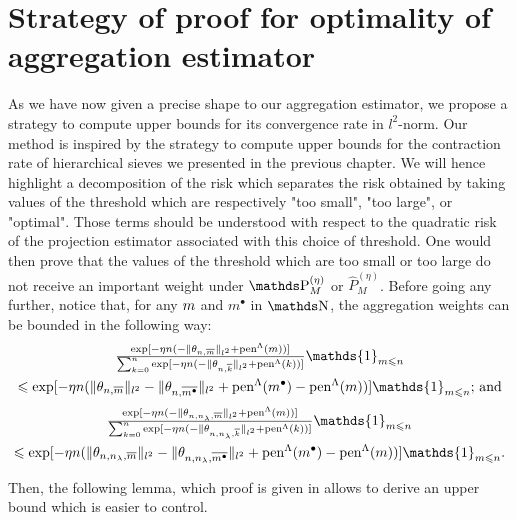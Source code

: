 \section{Strategy of proof for optimality of aggregation estimator}\label{freq:ge:strat}\label{FREQ_STRATEGY}
As we have now given a precise shape to our aggregation estimator, we propose a strategy to compute upper bounds for its convergence rate in $l^{2}$-norm.
Our method is inspired by the strategy to compute upper bounds for the contraction rate of hierarchical sieves we presented in the previous chapter.
We will hence highlight a decomposition of the risk which separates the risk obtained by taking values of the threshold which are respectively "too small", "too large", or "optimal".
Those terms should be understood with respect to the quadratic risk of the projection estimator associated with this choice of threshold.
One would then prove that the values of the threshold which are too small or too large do not receive an important weight under $\P_{M}^{(\eta)}$ or $\widehat{P}_{M}^{(\eta)}$.
Before going any further, notice that, for any $m$ and $m^{\bullet}$ in $\N$, the aggregation weights can be bounded in the following way:
\begin{multline*}
\tfrac{\exp[-\eta n (-\Vert \theta_{n, \overline{m}} \Vert_{l^{2}} + \pen^{\Lambda}(m))]}{\sum\nolimits_{k = 0}^{n} \exp[-\eta n (-\Vert \theta_{n, \overline{k}} \Vert_{l^{2}} + \pen^{\Lambda}(k))]} \mathds{1}_{m \leq n}\\
\leq \exp[-\eta n (\Vert \theta_{n, \overline{m}} \Vert_{l^{2}} - \Vert \theta_{n, \overline{m^{\bullet}}} \Vert_{l^{2}} + \pen^{\Lambda}(m^{\bullet}) - \pen^{\Lambda}(m))] \mathds{1}_{m \leq n}\text{; and}
\end{multline*}
\begin{multline*}
\tfrac{\exp[-\eta n (-\Vert \theta_{n, n_{\lambda}, \overline{m}} \Vert_{l^{2}} + \pen^{\Lambda}(m))]}{\sum\nolimits_{k = 0}^{n} \exp[-\eta n (-\Vert \theta_{n, n_{\lambda}, \overline{k}} \Vert_{l^{2}} + \pen^{\Lambda}(k))]} \mathds{1}_{m \leq n}\\
\leq \exp[-\eta n (\Vert \theta_{n, n_{\lambda}, \overline{m}} \Vert_{l^{2}} - \Vert \theta_{n, n_{\lambda}, \overline{m^{\bullet}}} \Vert_{l^{2}} + \pen^{\Lambda}(m^{\bullet}) - \pen^{\Lambda}(m))] \mathds{1}_{m \leq n}.
\end{multline*}

Then, the following lemma, which proof is given in  allows to derive an upper bound which is easier to control.

